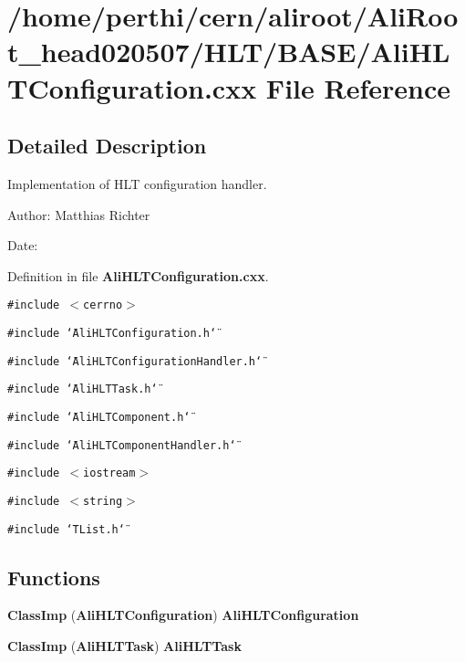\section{/home/perthi/cern/aliroot/Ali\-Root\_\-head020507/HLT/BASE/Ali\-HLTConfiguration.cxx File Reference}
\label{AliHLTConfiguration_8cxx}


\subsection{Detailed Description}
Implementation of HLT configuration handler. 

\begin{Desc}
\item[Author:]Matthias Richter \end{Desc}
\begin{Desc}
\item[Date:]\end{Desc}


Definition in file {\bf Ali\-HLTConfiguration.cxx}.

{\tt \#include $<$cerrno$>$}\par
{\tt \#include \char`\"{}Ali\-HLTConfiguration.h\char`\"{}}\par
{\tt \#include \char`\"{}Ali\-HLTConfiguration\-Handler.h\char`\"{}}\par
{\tt \#include \char`\"{}Ali\-HLTTask.h\char`\"{}}\par
{\tt \#include \char`\"{}Ali\-HLTComponent.h\char`\"{}}\par
{\tt \#include \char`\"{}Ali\-HLTComponent\-Handler.h\char`\"{}}\par
{\tt \#include $<$iostream$>$}\par
{\tt \#include $<$string$>$}\par
{\tt \#include \char`\"{}TList.h\char`\"{}}\par
\subsection*{Functions}
\begin{CompactItemize}
\item 
{\bf Class\-Imp} ({\bf Ali\-HLTConfiguration}) {\bf Ali\-HLTConfiguration}
\item 
{\bf Class\-Imp} ({\bf Ali\-HLTTask}) {\bf Ali\-HLTTask}
\end{CompactItemize}


